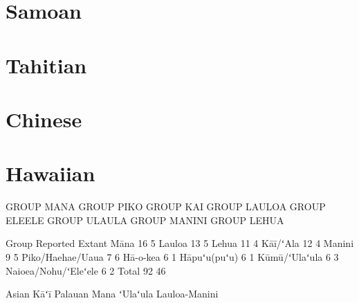 \documentclass[
]{article}
\begin{document}
\section{Samoan}\label{samoan}

\section{Tahitian}\label{tahitian}

\section{Chinese}\label{chinese}

\section{Hawaiian}\label{hawaiian}

GROUP MANA GROUP PIKO GROUP KAI GROUP LAULOA GROUP ELEELE GROUP ULAULA
GROUP MANINI GROUP LEHUA

Group Reported Extant Māna 16 5 Lauloa 13 5 Lehua 11 4 Kāī/ʻAla 12 4
Manini 9 5 Piko/Haehae/Uaua 7 6 Hā-o-kea 6 1 Hāpuʻu(puʻu) 6 1
Kūmū/ʻUlaʻula 6 3 Naioea/Nohu/ʻEleʻele 6 2 Total 92 46

Asian Kāʻī Palauan Mana ʻUlaʻula Lauloa-Manini
\end{document}
